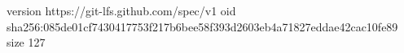 version https://git-lfs.github.com/spec/v1
oid sha256:085de01cf7430417753f217b6bee58f393d2603eb4a71827eddae42cac10fe89
size 127
